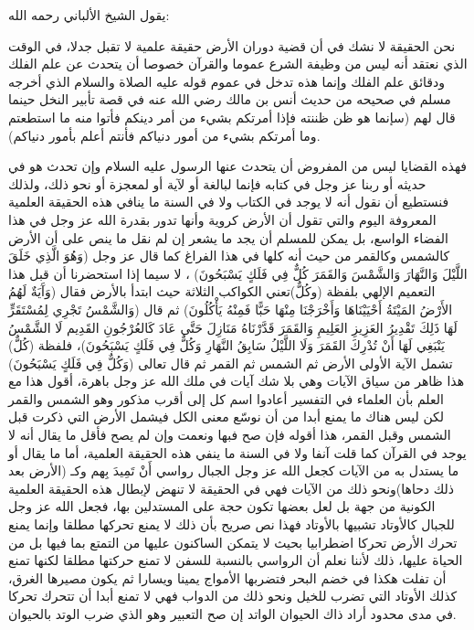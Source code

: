 يقول الشيخ الألباني رحمه الله: 

نحن الحقيقة لا نشك في أن قضية دوران الأرض حقيقة علمية لا تقبل جدلا، في الوقت الذي نعتقد أنه ليس من وظيفة الشرع عموما والقرآن خصوصا أن يتحدث عن علم الفلك ودقائق علم الفلك وإنما هذه تدخل في عموم قوله عليه الصلاة والسلام الذي أخرجه مسلم في صحيحه من حديث أنس بن مالك رضي الله عنه في قصة تأبير النخل حينما قال لهم (سإنما هو ظن ظننته فإذا أمرتكم بشيء من أمر دينكم فأتوا منه ما استطعتم وما أمرتكم بشيء من أمور دنياكم فأنتم أعلم بأمور دنياكم).

فهذه القضايا ليس من المفروض أن يتحدث عنها الرسول عليه السلام وإن تحدث هو في حديثه أو ربنا عز وجل في كتابه فإنما لبالغة أو لآية أو لمعجزة أو نحو ذلك، ولذلك فنستطيع أن نقول أنه لا يوجد في الكتاب ولا في السنة ما ينافي هذه الحقيقة العلمية المعروفة اليوم والتي تقول أن الأرض كروية وأنها تدور بقدرة الله عز وجل في هذا الفضاء الواسع، بل يمكن للمسلم أن يجد ما يشعر إن لم نقل ما ينص على أن الأرض كالشمس وكالقمر من حيث أنه كلها في هذا الفراغ كما قال عز وجل (وَهُوَ الَّذِي خَلَقَ اللَّيْلَ وَالنَّهَارَ وَالشَّمْسَ وَالقَمَرَ كُلٌّ فِي فَلَكٍ يَسْبَحُونَ) ، لا سيما إذا استحضرنا أن قبل هذا التعميم الإلهي بلفظة (وكُلٌّ)تعني الكواكب الثلاثة حيث ابتدأ بالأرض فقال (وَآَيَةٌ لَهُمُ الأَرْضُ المَيْتَةُ أَحْيَيْنَاهَا وَأَخْرَجْنَا مِنْهَا حَبًّا فَمِنْهُ يَأْكُلُونَ) ثم قال (وَالشَّمْسُ تَجْرِي لِمُسْتَقَرٍّ لَهَا ذَلِكَ تَقْدِيرُ العَزِيزِ العَلِيمِ وَالقَمَرَ قَدَّرْنَاهُ مَنَازِلَ حَتَّى عَادَ كَالعُرْجُونِ القَدِيم لَا الشَّمْسُ يَنْبَغِي لَهَا أَنْ تُدْرِكَ القَمَرَ وَلَا اللَّيْلُ سَابِقُ النَّهَارِ وَكُلٌّ فِي فَلَكٍ يَسْبَحُونَ)، فلفظة (كُلٌّ) تشمل الآية الأولى الأرض ثم الشمس ثم القمر ثم قال تعالى (وَكُلٌّ فِي فَلَكٍ يَسْبَحُونَ) هذا ظاهر من سياق الآيات وهي بلا شك آيات في ملك الله عز وجل باهرة، أقول هذا مع العلم بأن العلماء في التفسير أعادوا اسم كل إلى أقرب مذكور وهو الشمس والقمر لكن ليس هناك ما يمنع أبدا من أن نوسّع معنى الكل فيشمل الأرض التي ذكرت قبل الشمس وقبل القمر، هذا أقوله فإن صح فبها ونعمت وإن لم يصح فأقل ما يقال أنه لا يوجد في القرآن كما قلت آنفا ولا في السنة ما ينفي هذه الحقيقة العلمية، أما ما يقال أو ما يستدل به من الآيات كجعل الله عز وجل الجبال رواسي أَنْ تَمِيدَ بِهم وكـ (الأرض بعد ذلك دحاها)ونحو ذلك من الآيات فهي في الحقيقة لا تنهض لإبطال هذه الحقيقة العلمية الكونية من جهة بل لعل بعضها تكون حجة على المستدلين بها، فجعل الله عز وجل للجبال كالأوتاد تشبيها بالأوتاد فهذا نص صريح بأن ذلك لا يمنع تحركها مطلقا وإنما يمنع تحرك الأرض تحركا اضطرابيا بحيث لا يتمكن الساكنون عليها من التمتع بما فيها بل من الحياة عليها، ذلك لأننا نعلم أن الرواسي بالنسبة للسفن لا تمنع حركتها مطلقا لكنها تمنع أن تفلت هكذا في خضم البحر فتضربها الأمواج يمينا ويسارا ثم يكون مصيرها الغرق، كذلك الأوتاد التي تضرب للخيل ونحو ذلك من الدواب فهي لا تمنع أبدا أن تتحرك تحركا في مدى محدود أراد ذاك الحيوان الواتد إن صح التعبير وهو الذي ضرب الوتد بالحيوان.
